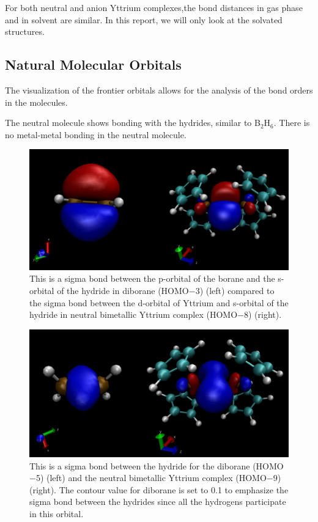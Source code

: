 \documentclass[11pt]{article}
\begin{document}
For both neutral and anion Yttrium complexes,the bond distances
in gas phase and in solvent are similar. In this report, we will
only look at the solvated structures.

\subsection{Natural Molecular Orbitals}

The visualization of the frontier orbitals allows for the
analysis of the bond orders in the molecules.

The neutral molecule shows bonding with the hydrides,
similar to B$_2$H$_6$. There is no metal-metal bonding in the
neutral molecule.

\begin{figure}[H]
  \centering
  \includegraphics[scale=0.2]{b2h6_ytt.png}
  \caption{This is a sigma bond between the p-orbital of the borane
    and the s-orbital of the hydride in diborane (HOMO$-$3) (left) compared
    to the sigma bond between the d-orbital of Yttrium and s-orbital of the hydride in neutral
    bimetallic Yttrium complex (HOMO$-$8) (right).}
  \label{fig:hydride}
\end{figure}

\begin{figure}[htbp]
  \centering
  \includegraphics[scale=0.2]{hhbond.png}
  \caption{This is a sigma bond between the hydride for the diborane (HOMO$-$5) (left)
  and the neutral bimetallic Yttrium complex (HOMO$-$9) (right).
    The contour value for diborane is set to
    0.1 to emphasize the sigma bond between the hydrides since all the hydrogens participate in
    this orbital.}
  \label{fig:hhbond}
\end{figure}
\end{document}
